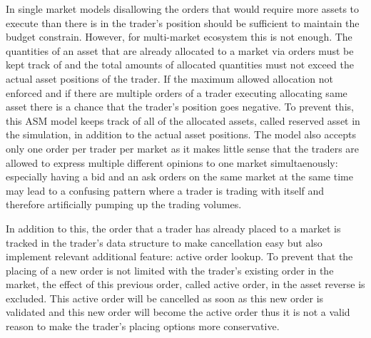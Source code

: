 In single market models disallowing the orders that would require more assets to execute
than there is in the trader's position should be sufficient to maintain the budget constrain. 
However, for multi-market ecosystem this is not enough. The quantities of an asset 
that are already allocated to a market via orders must be kept track of and the total amounts of 
allocated quantities must not exceed the actual asset positions of the trader. If the maximum allowed 
allocation not enforced and if there are multiple orders of a trader executing allocating same asset
there is a chance that the trader's position goes negative. 
To prevent this, this ASM model keeps track of all of the allocated assets, called reserved asset 
in the simulation, in addition to the actual asset positions. The model also
accepts only one order per trader per market as it makes little sense that
the traders are allowed to express multiple different opinions to one market 
simultaenously: especially having a bid and an ask orders on the same market
at the same time may lead to a confusing pattern where a trader is trading with
itself and therefore artificially pumping up the trading volumes. 

In addition to this, the order that a trader has already placed
to a market is tracked in the trader's data structure to make cancellation easy
but also implement relevant additional feature: active order lookup. To prevent that
the placing of a new order is not limited with the trader's existing order in the market,
the effect of this previous order, called active order, in the asset reverse is excluded. 
This active order will be cancelled as soon as this new order is validated and this new order
will become the active order thus it is not a valid reason to make the trader's placing 
options more conservative.

